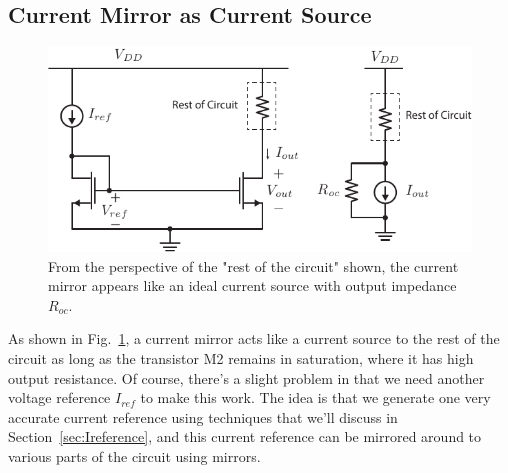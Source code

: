 \subsection{Current Mirror as Current Source}
\begin{figure}[tb]
\centering
\includegraphics[scale=1]{7mirror_current_source.pdf}
\caption{From the perspective of the "rest of the circuit" shown, the current mirror appears like an ideal current source with output impedance $R_{oc}$.}
\label{fig:7mirror_current_source.pdf}
\end{figure}
As shown in Fig.~\ref{fig:7mirror_current_source.pdf}, a current mirror acts like a current source to the rest of the circuit as long as the transistor M2 remains in saturation, where it has high output resistance.  Of course, there's a slight problem in that we need another voltage reference $I_{ref}$ to make this work.  The idea is that we generate one very accurate current reference using techniques that we'll discuss in Section~\ref{sec:Ireference}, and this current reference can be mirrored around to various parts of the circuit using mirrors.  

